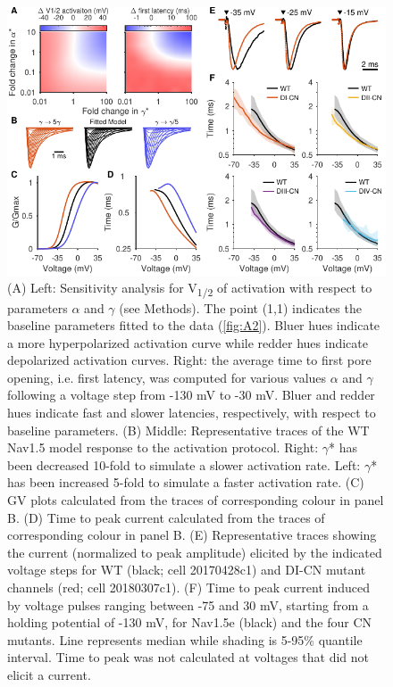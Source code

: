 \begin{figure}[t]
\centering
\includegraphics[width=120mm]{Figures/AppendixA/figure03.pdf}
\caption{
(A) Left: Sensitivity analysis for V\textsubscript{1/2} of activation with respect to parameters $\alpha$ and $\gamma$ (see Methods). The point (1,1) indicates the baseline parameters fitted to the data (\autoref{fig:A2}). Bluer hues indicate a more hyperpolarized activation curve while redder hues indicate depolarized activation curves. Right: the average time to first pore opening, i.e. first latency, was computed for various values $\alpha$ and $\gamma$ following a voltage step from -130 mV to -30 mV. Bluer and redder hues indicate fast and slower latencies, respectively, with respect to baseline parameters.
(B) Middle: Representative traces of the WT Nav1.5 model response to the activation protocol. Right: $\gamma$* has been decreased 10-fold to simulate a slower activation rate. Left: $\gamma$* has been increased 5-fold to simulate a faster activation rate.
(C) GV plots calculated from the traces of corresponding colour in panel B. 
(D) Time to peak current calculated from the traces of corresponding colour in panel B. 
(E) Representative traces showing the current (normalized to peak amplitude) elicited by the indicated voltage steps for WT (black; cell 20170428c1) and DI-CN mutant channels (red; cell 20180307c1). 
(F) Time to peak current induced by voltage pulses ranging between -75 and 30 mV, starting from a holding potential of -130 mV, for Nav1.5e (black) and the four CN mutants. Line represents median while shading is 5-95\% quantile interval. Time to peak was not calculated at voltages that did not elicit a current.
}
\label{fig:A3}
\end{figure}

